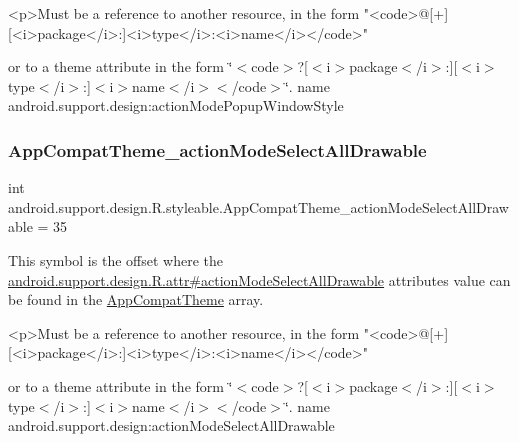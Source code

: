 \begin{DoxyVerb}      <p>Must be a reference to another resource, in the form "<code>@[+][<i>package</i>:]<i>type</i>:<i>name</i></code>"
\end{DoxyVerb}
 or to a theme attribute in the form \char`\"{}$<$code$>$?\mbox{[}$<$i$>$package$<$/i$>$\+:\mbox{]}\mbox{[}$<$i$>$type$<$/i$>$\+:\mbox{]}$<$i$>$name$<$/i$>$$<$/code$>$\char`\"{}.  name android.\+support.\+design\+:action\+Mode\+Popup\+Window\+Style \mbox{\label{classandroid_1_1support_1_1design_1_1R_1_1styleable_aaf0de120209af4d10c6850f628fc12b1}} 
\subsubsection{\texorpdfstring{App\+Compat\+Theme\+\_\+action\+Mode\+Select\+All\+Drawable}{AppCompatTheme\_actionModeSelectAllDrawable}}
{\footnotesize\ttfamily int android.\+support.\+design.\+R.\+styleable.\+App\+Compat\+Theme\+\_\+action\+Mode\+Select\+All\+Drawable = 35\hspace{0.3cm}{\ttfamily [static]}}

This symbol is the offset where the \hyperlink{classandroid_1_1support_1_1design_1_1R_1_1attr_afd0f5aed05e8bb00730e84fb8bd500de}{android.\+support.\+design.\+R.\+attr\#action\+Mode\+Select\+All\+Drawable} attribute\textquotesingle{}s value can be found in the \hyperlink{classandroid_1_1support_1_1design_1_1R_1_1styleable_afb351dc8de20cbd4c89abe360373010c}{App\+Compat\+Theme} array.

\begin{DoxyVerb}      <p>Must be a reference to another resource, in the form "<code>@[+][<i>package</i>:]<i>type</i>:<i>name</i></code>"
\end{DoxyVerb}
 or to a theme attribute in the form \char`\"{}$<$code$>$?\mbox{[}$<$i$>$package$<$/i$>$\+:\mbox{]}\mbox{[}$<$i$>$type$<$/i$>$\+:\mbox{]}$<$i$>$name$<$/i$>$$<$/code$>$\char`\"{}.  name android.\+support.\+design\+:action\+Mode\+Select\+All\+Drawable \mbox{\label{classandroid_1_1support_1_1design_1_1R_1_1styleable_a5cc3bc3db3f4a7934ec84ad88a523f1a}} 
